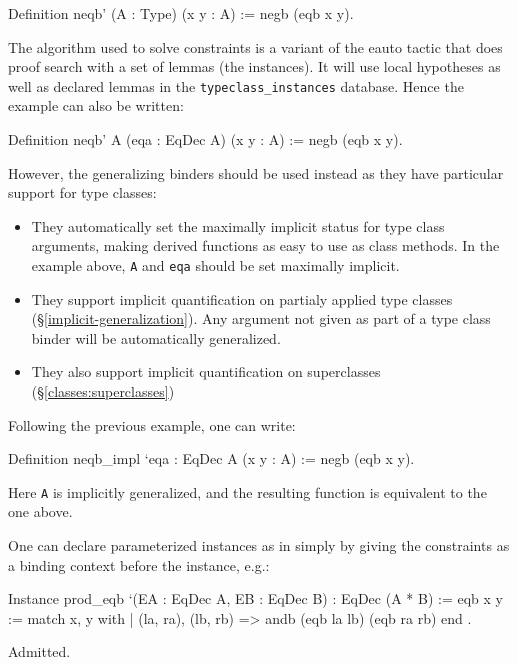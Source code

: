 \begin{coq_example}
Definition neqb' (A : Type) (x y : A) := negb (eqb x y).
\end{coq_example}

The algorithm used to solve constraints is a variant of the eauto tactic
that does proof search with a set of lemmas (the instances). It will use
local hypotheses as well as declared lemmas in the
\texttt{typeclass\_instances} database. Hence the example can also be
written:

\begin{coq_example}
Definition neqb' A (eqa : EqDec A) (x y : A) := negb (eqb x y).
\end{coq_example}

However, the generalizing binders should be used instead as they have
particular support for type classes:
\begin{itemize}
\item They automatically set the maximally implicit status for type
  class arguments, making derived functions as easy to use as class
  methods. In the example above, \texttt{A} and \texttt{eqa} should be
  set maximally implicit.
\item They support implicit quantification on partialy applied type
  classes (\S \ref{implicit-generalization}).
  Any argument not given as part of a type class binder will be
  automatically generalized.
\item They also support implicit quantification on superclasses
  (\S \ref{classes:superclasses})
\end{itemize}

Following the previous example, one can write:
\begin{coq_example}
Definition neqb_impl `{eqa : EqDec A} (x y : A) := negb (eqb x y).
\end{coq_example}

Here \texttt{A} is implicitly generalized, and the resulting function
is equivalent to the one above.


One can declare parameterized instances as in \Haskell simply by giving
the constraints as a binding context before the instance, e.g.:

\begin{coq_example}
Instance prod_eqb `(EA : EqDec A, EB : EqDec B) : EqDec (A * B) :=
{ eqb x y := match x, y with
  | (la, ra), (lb, rb) => andb (eqb la lb) (eqb ra rb)
  end }.
\end{coq_example}
\begin{coq_eval}
Admitted.
\end{coq_eval}

